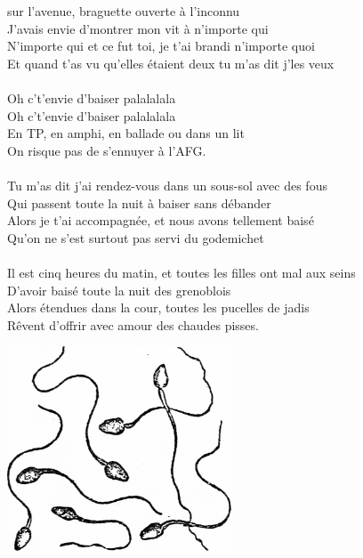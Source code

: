 
 sur l'avenue, braguette ouverte à l'inconnu
\\J'avais envie d'montrer mon vit à n'importe qui
\\N'importe qui et ce fut toi, je t'ai brandi n'importe quoi
\\Et quand t'as vu qu'elles étaient deux tu m'as dit j'les veux
\\\\Oh c't'envie d'baiser palalalala
\\Oh c't'envie d'baiser palalalala
\\En TP, en amphi, en ballade ou dans un lit
\\On risque pas de s'ennuyer à l'AFG.
\\\\Tu m'as dit j'ai rendez-vous dans un sous-sol avec des fous
\\Qui passent toute la nuit à baiser sans débander
\\Alors je t'ai accompagnée, et nous avons tellement baisé
\\Qu'on ne s'est surtout pas servi du godemichet
\\\\Il est cinq heures du matin, et toutes les filles ont mal aux seins
\\D'avoir baisé toute la nuit des grenoblois
\\Alors étendues dans la cour, toutes les pucelles de jadis
\\Rêvent d'offrir avec amour des chaudes pisses.

\bigskip
\begin{center}
\includegraphics[width=0.5\textwidth]{images/brev49.png}
\end{center}

\breakpage